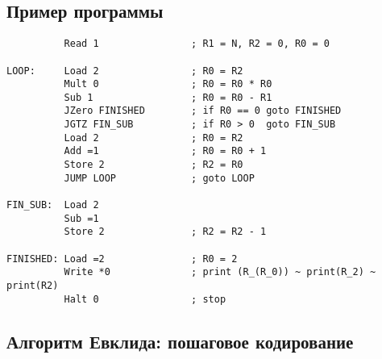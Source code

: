 \documentclass[a4paper, 12pt]{extarticle}
\begin{document}
\subsection*{Пример программы}
\begin{verbatim}
          Read 1                ; R1 = N, R2 = 0, R0 = 0
          
LOOP:     Load 2                ; R0 = R2
          Mult 0                ; R0 = R0 * R0
          Sub 1                 ; R0 = R0 - R1
          JZero FINISHED        ; if R0 == 0 goto FINISHED
          JGTZ FIN_SUB          ; if R0 > 0  goto FIN_SUB
          Load 2                ; R0 = R2
          Add =1                ; R0 = R0 + 1
          Store 2               ; R2 = R0
          JUMP LOOP             ; goto LOOP

FIN_SUB:  Load 2                
          Sub =1
          Store 2               ; R2 = R2 - 1

FINISHED: Load =2               ; R0 = 2
          Write *0              ; print (R_(R_0)) ~ print(R_2) ~ print(R2)
          Halt 0                ; stop
\end{verbatim}

\newpage
\subsection*{Алгоритм Евклида: пошаговое кодирование}
\end{document}
